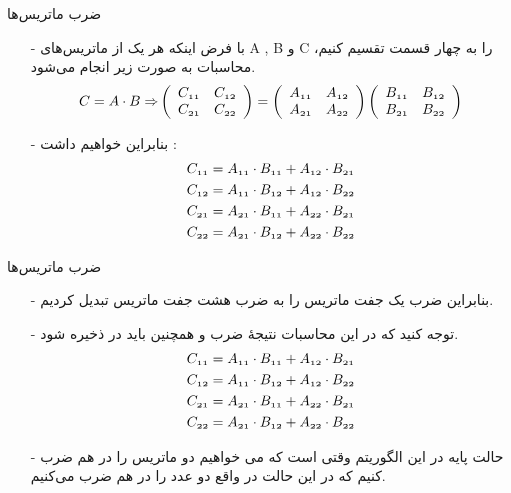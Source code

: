 \begin{frame}{‌ضرب ماتریس‌ها}
\begin{itemize}\itemr
\item[-]
با فرض اینکه هر یک از ماتریس‌های
A
,
B
و
C
را به چهار قسمت تقسیم کنیم، محاسبات به صورت زیر انجام می‌شود.
\begin{align*}
\mathnormal{C = A \cdot B \Rightarrow} \left( \begin{array}{cc} \mathnormal{C_{11}} & \mathnormal{C_{12}} \\ \mathnormal{C_{21}} & \mathnormal{C_{22}} \end{array} \right)
= \left( \begin{array}{cc} \mathnormal{A_{11}} & \mathnormal{A_{12}} \\ \mathnormal{A_{21}} & \mathnormal{A_{22}} \end{array} \right)
\left( \begin{array}{cc} \mathnormal{B_{11}} & \mathnormal{B_{12}} \\ \mathnormal{B_{21}} & \mathnormal{B_{22}} \end{array} \right)
\end{align*}
\item[-]
بنابراین خواهیم داشت :
\begin{align*}
\mathnormal{C_{11} = A_{11} \cdot B_{11} + A_{12} \cdot B_{21}}\\
\mathnormal{C_{12}= A_{11} \cdot B_{12} + A_{12} \cdot B_{22}}\\
\mathnormal{C_{21}= A_{21} \cdot B_{11} + A_{22} \cdot B_{21}}\\
\mathnormal{C_{22}= A_{21} \cdot B_{12} + A_{22} \cdot B_{22}}
\end{align*}
\end{itemize}
\end{frame}



\begin{frame}{‌ضرب ماتریس‌ها}
\begin{itemize}\itemr
\item[-]
بنابراین ضرب یک جفت ماتریس 
را به ضرب هشت جفت ماتریس 
تبدیل کردیم.
\item[-]
توجه کنید که در این محاسبات نتیجهٔ ضرب
و همچنین
باید در 
ذخیره شود.
\begin{align*}
\mathnormal{C_{11} = A_{11} \cdot B_{11} + A_{12} \cdot B_{21}}\\
\mathnormal{C_{12}= A_{11} \cdot B_{12} + A_{12} \cdot B_{22}}\\
\mathnormal{C_{21}= A_{21} \cdot B_{11} + A_{22} \cdot B_{21}}\\
\mathnormal{C_{22}= A_{21} \cdot B_{12} + A_{22} \cdot B_{22}}
\end{align*}
\item[-]
حالت پایه در این الگوریتم وقتی است که می خواهیم دو ماتریس
را در هم ضرب کنیم که در این حالت در واقع دو عدد را در هم ضرب می‌کنیم.
\end{itemize}
\end{frame}


